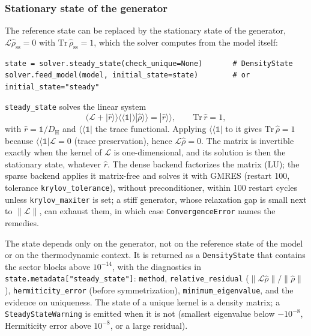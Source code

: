 \documentclass[11pt]{article}
\newcommand{\kket}[1]{|#1\rangle\!\rangle}
\begin{document}
\subsubsection{Stationary state of the generator}
\label{sec:steady-state}

The reference state can be replaced by the stationary state of the generator, $\mathcal{L}\hat\rho_{\mathrm{ss}}=0$ with $\mathrm{Tr}\,\hat\rho_{\mathrm{ss}}=1$, which the solver computes from the model itself:
\begin{verbatim}
state = solver.steady_state(check_unique=None)       # DensityState
solver.feed_model(model, initial_state=state)        # or initial_state="steady"
\end{verbatim}
\texttt{steady\_state} solves the linear system
\begin{equation}
    \big(\mathcal{L}+\kket{\hat r}\langle\!\langle\mathbb{1}|\big)\kket{\hat\rho}=\kket{\hat r},
    \qquad \mathrm{Tr}\,\hat r=1 ,
\end{equation}
with $\hat r=\mathbb{1}/D_{\mathrm H}$ and $\langle\!\langle\mathbb{1}|$ the trace functional. Applying $\langle\!\langle\mathbb{1}|$ to it gives $\mathrm{Tr}\,\hat\rho=1$ because $\langle\!\langle\mathbb{1}|\mathcal{L}=0$ (trace preservation), hence $\mathcal{L}\hat\rho=0$. The matrix is invertible exactly when the kernel of $\mathcal{L}$ is one-dimensional, and its solution is then the stationary state, whatever $\hat r$. The dense backend factorizes the matrix (LU); the sparse backend applies it matrix-free and solves it with GMRES (restart 100, tolerance \texttt{krylov\_tolerance}), without preconditioner, within 100 restart cycles unless \texttt{krylov\_maxiter} is set; a stiff generator, whose relaxation gap is small next to $\|\mathcal{L}\|$, can exhaust them, in which case \texttt{ConvergenceError} names the remedies.

The state depends only on the generator, not on the reference state of the model or on the thermodynamic context. It is returned as a \texttt{DensityState} that contains the sector blocks above $10^{-14}$, with the diagnostics in \texttt{state.metadata["steady\_state"]}: \texttt{method}, \texttt{relative\_residual} ($\lVert\mathcal{L}\hat\rho\rVert/\lVert\hat\rho\rVert$), \texttt{hermiticity\_error} (before symmetrization), \texttt{minimum\_eigenvalue}, and the evidence on uniqueness. The state of a unique kernel is a density matrix; a \texttt{SteadyStateWarning} is emitted when it is not (smallest eigenvalue below $-10^{-8}$, Hermiticity error above $10^{-8}$, or a large residual).
\end{document}
